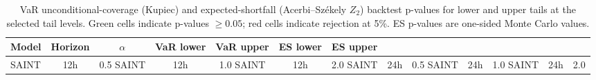 \begin{table}[ht]
\centering
\small
\setlength{\tabcolsep}{6pt}
\begin{tabular}{l c c c c c c}
\toprule
Model & Horizon & $\alpha$ & VaR lower & VaR upper & ES lower & ES upper \\
\midrule
SAINT & 12h & 0.5%
SAINT & 12h & 1.0%
SAINT & 12h & 2.0%
\midrule
SAINT & 24h & 0.5%
SAINT & 24h & 1.0%
SAINT & 24h & 2.0%
\midrule
\bottomrule
\end{tabular}
\caption{VaR unconditional-coverage (Kupiec) and expected-shortfall (Acerbi--Sz\'ekely $Z_2$) backtest p-values for lower and upper tails at the selected tail levels. Green cells indicate p-values $\geq 0.05$; red cells indicate rejection at 5\%. ES p-values are one-sided Monte Carlo values.}
\label{tab:saint_var_es_backtests}
\end{table}
